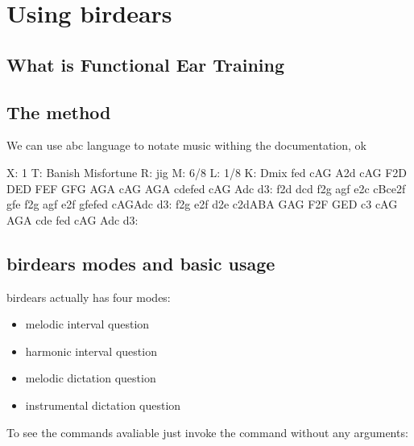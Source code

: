 \documentclass[letterpaper,10pt,english]{sphinxmanual}
\begin{document}
\chapter{Using birdears}
\label{\detokenize{index:using-birdears}}

\section{What is Functional Ear Training}
\label{\detokenize{index:what-is-functional-ear-training}}


\section{The method}
\label{\detokenize{index:the-method}}
We can use abc language to notate music withing the documentation, ok

\begin{sphinxVerbatim}[commandchars=\\\{\}]
X: 1
T: Banish Misfortune
R: jig
M: 6/8
L: 1/8
K: Dmix
fed cAG\textbar{} A2d cAG\textbar{} F2D DED\textbar{} FEF GFG\textbar{}
AGA cAG\textbar{} AGA cde\textbar{}fed cAG\textbar{} Ad\PYGZca{}c d3:\textbar{}
f2d d\PYGZca{}cd\textbar{} f2g agf\textbar{} e2c cBc\textbar{}e2f gfe\textbar{}
f2g agf\textbar{} e2f gfe\textbar{}fed cAG\textbar{}Ad\PYGZca{}c d3:\textbar{}
f2g e2f\textbar{} d2e c2d\textbar{}ABA GAG\textbar{} F2F GED\textbar{}
c3 cAG\textbar{} AGA cde\textbar{} fed cAG\textbar{} Ad\PYGZca{}c d3:\textbar{}
\end{sphinxVerbatim}


\section{birdears modes and basic usage}
\label{\detokenize{index:birdears-modes-and-basic-usage}}
birdears actually has four modes:
\begin{itemize}
\item {} 
melodic interval question

\item {} 
harmonic interval question

\item {} 
melodic dictation question

\item {} 
instrumental dictation question

\end{itemize}

To see the commands avaliable just invoke the command without any arguments:
\end{document}
